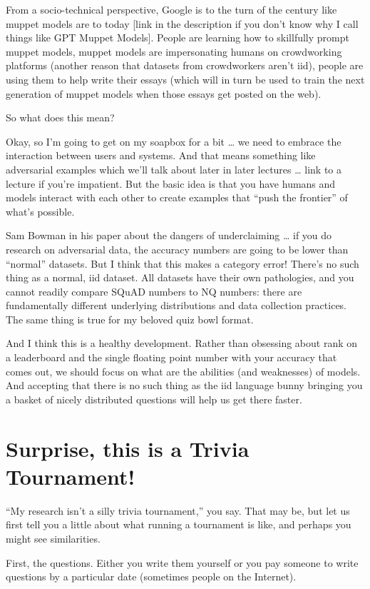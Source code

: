 From a socio-technical perspective, Google is to the turn of the century like muppet models are to today [link in the description if you don’t know why I call things like GPT Muppet Models].  People are learning how to skillfully prompt muppet models, muppet models are impersonating humans on crowdworking platforms (another reason that datasets from crowdworkers aren’t iid), people are using them to help write their essays (which will in turn be used to train the next generation of muppet models when those essays get posted on the web).  

So what does this mean?  

Okay, so I’m going to get on my soapbox for a bit … we need to embrace the interaction between users and systems.  And that means something like adversarial examples which we’ll talk about later in later lectures … link to a lecture if you’re impatient.  But the basic idea is that you have humans and models interact with each other to create examples that “push the frontier” of what’s possible.

Sam Bowman in his paper about the dangers of underclaiming … if you do research on adversarial data, the accuracy numbers are going to be lower than “normal” datasets.  But I think that this makes a category error!  There’s no such thing as a normal, iid dataset.  All datasets have their own pathologies, and you cannot readily compare SQuAD numbers to NQ numbers: there are fundamentally different underlying distributions and data collection practices.  The same thing is true for my beloved quiz bowl format.

And I think this is a healthy development.  Rather than obsessing about rank on a leaderboard and the single floating point number with your accuracy that comes out, we should focus on what are the abilities (and weaknesses) of models.  And accepting that there is no such thing as the iid language bunny bringing you a basket of nicely distributed questions will help us get there faster.

\section{Surprise, this is a Trivia Tournament!}
\label{sec:tournament}


``My research isn't a silly trivia tournament,'' you say.
That may be, but let us first tell you a little about what running a tournament is like, and perhaps you might see similarities.


First, the questions.
Either you write them yourself or you pay someone to write questions by a particular date (sometimes people on the Internet). 

